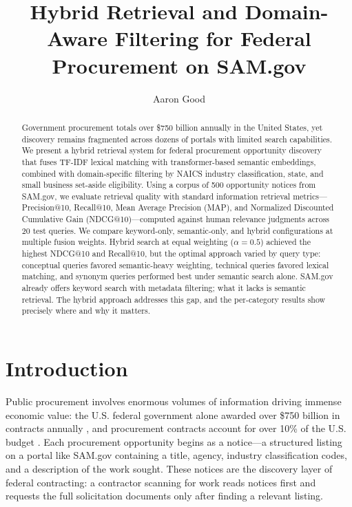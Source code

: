 \documentclass[10pt,twocolumn]{article}
\title{Hybrid Retrieval and Domain-Aware Filtering for Federal Procurement on SAM.gov}
\author{Aaron Good}
\affiliation{Occidental College}
\begin{document}
\maketitle

\begin{abstract}
Government procurement totals over \$750 billion annually in the United States, yet discovery remains fragmented across dozens of portals with limited search capabilities. We present a hybrid retrieval system for federal procurement opportunity discovery that fuses TF-IDF lexical matching with transformer-based semantic embeddings, combined with domain-specific filtering by NAICS industry classification, state, and small business set-aside eligibility. Using a corpus of 500 opportunity notices from SAM.gov, we evaluate retrieval quality with standard information retrieval metrics---Precision@10, Recall@10, Mean Average Precision (MAP), and Normalized Discounted Cumulative Gain (NDCG@10)---computed against human relevance judgments across 20 test queries. We compare keyword-only, semantic-only, and hybrid configurations at multiple fusion weights. Hybrid search at equal weighting ($\alpha = 0.5$) achieved the highest NDCG@10 and Recall@10, but the optimal approach varied by query type: conceptual queries favored semantic-heavy weighting, technical queries favored lexical matching, and synonym queries performed best under semantic search alone. SAM.gov already offers keyword search with metadata filtering; what it lacks is semantic retrieval. The hybrid approach addresses this gap, and the per-category results show precisely where and why it matters.
\end{abstract}

\section{Introduction}

Public procurement involves enormous volumes of information driving immense economic value: the U.S. federal government alone awarded over \$750 billion in contracts annually \cite{HigherGov2022}, and procurement contracts account for over 10\% of the U.S. budget \cite{Omari2025}. Each procurement opportunity begins as a notice---a structured listing on a portal like SAM.gov containing a title, agency, industry classification codes, and a description of the work sought. These notices are the discovery layer of federal contracting: a contractor scanning for work reads notices first and requests the full solicitation documents only after finding a relevant listing.
\end{document}
